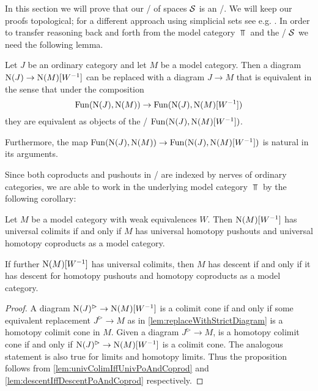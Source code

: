 In this section we will prove that our \inftycat/ of spaces $\mathcal{S}$ is an \inftytop/.
We will keep our proofs topological; for a different approach using simplicial sets see e.g. \cite[\S 6]{HTT}.
In order to transfer reasoning back and forth from the model category $\Top$ and the \inftycat/ $\mathcal{S}$ we need the following lemma.
\begin{thm}\label{lem:replaceWithStrictDiagram} %
    Let $J$ be an ordinary category and let $M$ be a model category.
    Then a diagram $\operatorname{N}(J)\to\operatorname{N}(M)[W^{-1}]$ can be replaced with a diagram $J\to M$ that is equivalent in the sense that under the composition
    \begin{equation*}
        \Fun(\N(J),\N(M))\to\Fun(\N(J),\N(M)[W^{-1}]) %
    \end{equation*} 
    they are equivalent as objects of the \inftycat/ $\operatorname{Fun}(\operatorname{N}(J),\operatorname{N}(M)[W^{-1}])$.

    Furthermore, the map $\operatorname{Fun}(\operatorname{N}(J),\operatorname{N}(M))\to\operatorname{Fun}(\operatorname{N}(J),\operatorname{N}(M)[W^{-1}])$ is natural in its arguments.
    \begin{reference}
        \cite[Proposition 1.3.4.25]{higher_algebra} %
    \end{reference}
\end{thm}
Since both coproducts and pushouts in \inftycats/ are indexed by nerves of ordinary categories, we are able to work in the underlying model category $\Top$ by the following corollary:
\begin{corollary}\label{cor:sufficientToProveInModCat}
    Let $M$ be a model category with weak equivalences $W$. 
    Then $\operatorname{N}(M)[W^{-1}]$ has universal colimits if and only if $M$ has universal homotopy pushouts and universal homotopy coproducts as a model category.
    
    If further $\operatorname{N}(M)[W^{-1}]$ has universal colimits, then $M$ has descent if and only if it has descent for homotopy pushouts and homotopy coproducts as a model category.
    \begin{proof}
        A diagram $\operatorname{N}(J)^{\rhd}\to\operatorname{N}(M)[W^{-1}]$ is a colimit cone if and only if some equivalent replacement $J^{\rhd}\to M$ as in \cref{lem:replaceWithStrictDiagram} is a homotopy colimit cone in $M$.
        Given a diagram $J^{\rhd}\to M$, is a homotopy colimit cone if and only if $\operatorname{N}(J)^{\rhd}\to\operatorname{N}(M)[W^{-1}]$ is a colimit cone.
        The analogous statement is also true for limits and homotopy limits.
        Thus the proposition follows from \cref{lem:univColimIffUnivPoAndCoprod} and \cref{lem:descentIffDescentPoAndCoprod} respectively.
    \end{proof}
\end{corollary}
